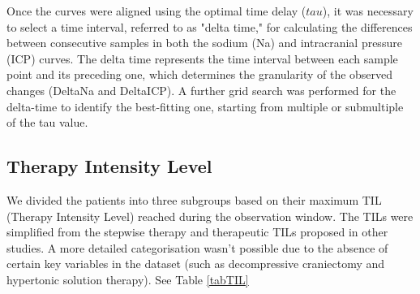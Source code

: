 Once the curves were aligned using the optimal time delay ($tau$), it was necessary to select a time interval, referred to as "delta time," for calculating the differences between consecutive samples in both the sodium (Na) and intracranial pressure (ICP) curves. The delta time represents the time interval between each sample point and its preceding one, which determines the granularity of the observed changes (DeltaNa and DeltaICP). 
A further grid search was performed for the delta-time to identify the best-fitting one, starting from multiple or submultiple of the tau value.

\subsection{Therapy Intensity Level}
We  divided the patients into three subgroups based on their maximum TIL (Therapy Intensity Level) reached during the observation window. The TILs were simplified from the stepwise therapy and therapeutic TILs proposed in other studies. A more detailed categorisation wasn’t possible due to the absence of certain key variables in the dataset (such as decompressive craniectomy and hypertonic solution therapy). See Table \ref{tabTIL}

